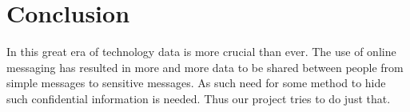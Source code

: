 \section{Conclusion}
In this great era of technology data is more crucial than ever. The use of online messaging has resulted in more and more data to be shared between people from simple
messages to sensitive messages. As such need for some method to hide such confidential information is needed. Thus our project tries to do just that.





\renewcommand\bibname{References} %



